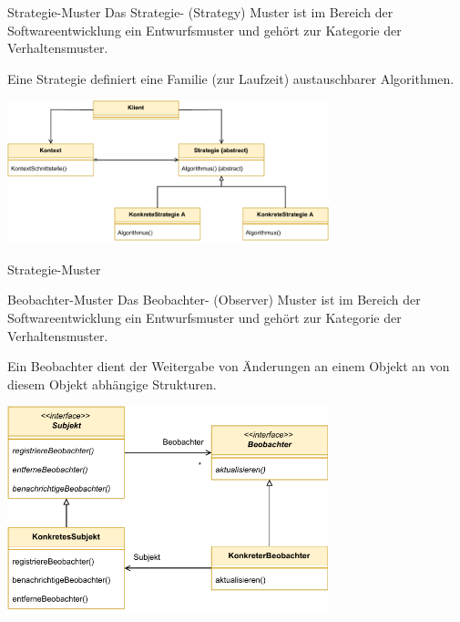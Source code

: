 \begin{defi}{Strategie-Muster}
    Das Strategie- (Strategy) Muster ist im Bereich der Softwareentwicklung ein Entwurfsmuster und gehört zur Kategorie der Verhaltensmuster.

    Eine Strategie definiert eine Familie (zur Laufzeit) austauschbarer Algorithmen.

    \begin{center}
        \includegraphics[width=0.7\textwidth]{includes/figures/defi_strategie.pdf}
    \end{center}
\end{defi}

\begin{example}{Strategie-Muster}
    

    

    
\end{example}


\begin{defi}{Beobachter-Muster}
    Das Beobachter- (Observer) Muster ist im Bereich der Softwareentwicklung ein Entwurfsmuster und gehört zur Kategorie der Verhaltensmuster.

    Ein Beobachter dient der Weitergabe von Änderungen an einem Objekt an von diesem Objekt abhängige Strukturen.

    \begin{center}
        \includegraphics[width=0.7\textwidth]{includes/figures/defi_beobachter.pdf}
    \end{center}
\end{defi}


